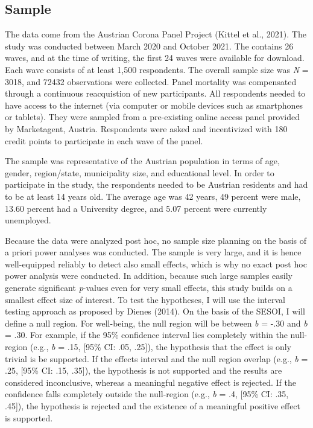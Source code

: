 \documentclass[
  english,
  man,mask,floatsintext]{apa6}
\begin{document}
\hypertarget{sample}{%
\subsection{Sample}\label{sample}}

The data come from the Austrian Corona Panel Project (Kittel et al., 2021).
The study was conducted between March 2020 and October 2021.
The contains 26 waves, and at the time of writing, the first 24 waves were available for download.
Each wave consists of at least 1,500 respondents.
The overall sample size was \emph{N} = 3018, and 72432 observations were collected.
Panel mortality was compensated through a continuous reacquistion of new participants.
All respondents needed to have access to the internet (via computer or mobile devices such as smartphones or tablets).
They were sampled from a pre-existing online access panel provided by Marketagent, Austria.
Respondents were asked and incentivized with 180 credit points to participate in each wave of the panel.

The sample was representative of the Austrian population in terms of age, gender, region/state, municipality size, and educational level. In order to participate in the study, the respondents needed to be Austrian residents and had to be at least 14 years old.
The average age was 42 years, 49 percent were male, 13.60 percent had a University degree, and 5.07 percent were currently unemployed.

Because the data were analyzed post hoc, no sample size planning on the basis of a priori power analyses was conducted.
The sample is very large, and it is hence well-equipped reliably to detect also small effects, which is why no exact post hoc power analysis were conducted.
In addition, because such large samples easily generate significant \emph{p}-values even for very small effects, this study builds on a smallest effect size of interest.
To test the hypotheses, I will use the interval testing approach as proposed by Dienes (2014).
On the basis of the SESOI, I will define a null region.
For well-being, the null region will be between \emph{b} = -.30 and \emph{b} = .30.
For example, if the 95\% confidence interval lies completely within the null-region (e.g., \emph{b} = .15, {[}95\% CI: .05, .25{]}), the hypothesis that the effect is only trivial is be supported.
If the effects interval and the null region overlap (e.g., \emph{b} = .25, {[}95\% CI: .15, .35{]}), the hypothesis is not supported and the results are considered inconclusive, whereas a meaningful negative effect is rejected.
If the confidence falls completely outside the null-region (e.g., \emph{b} = .4, {[}95\% CI: .35, .45{]}), the hypothesis is rejected and the existence of a meaningful positive effect is supported.
\end{document}
